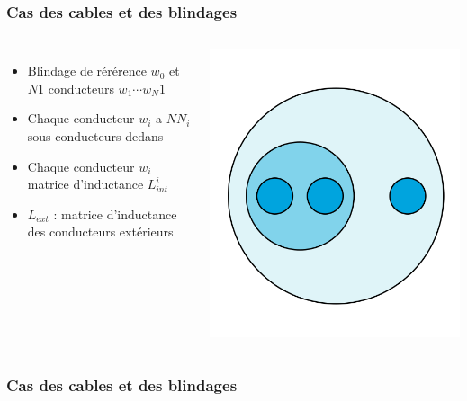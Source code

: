 \begin{frame}
\frametitle{Cas des cables et des blindages}
  \begin{columns}[T]
    \begin{itemize}
      \item Blindage de r\'er\'erence $w_0$ et $N1$ conducteurs $w_1 \cdots w_N1$
      \item Chaque conducteur $w_i$ a $NN_i$ sous conducteurs dedans
      \item Chaque conducteur $w_i$ matrice d'inductance $L_{int}^i$
      \item $L_{ext}$ : matrice d'inductance des conducteurs ext\'erieurs  
    \end{itemize}
\begin{center}
\includegraphics[scale=0.25]{figures/f2}
\end{center}
  \end{columns}
\end{frame}

\begin{frame}
\frametitle{Cas des cables et des blindages}

\end{frame}
